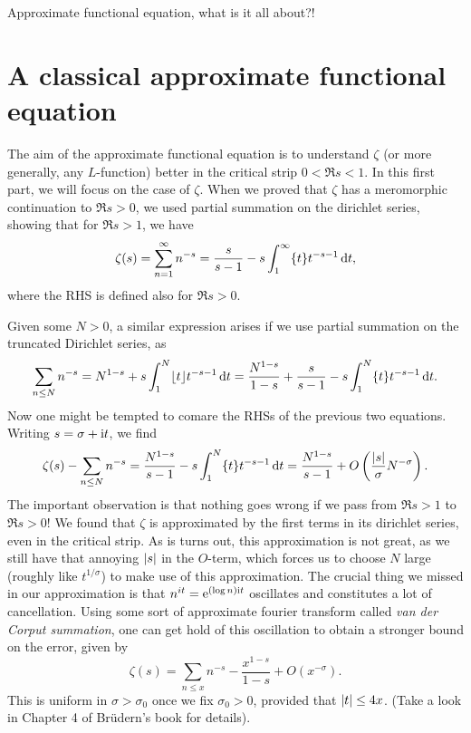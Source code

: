 \documentclass[a4paper,11pt]{article}
\author{Max von Consbruch}
\begin{document}
\begin{center}
    \huge{Approximate functional equation, what is it all about?!}
\end{center}

\section{A classical approximate functional equation} %
\label{sec:A classical approximate functional equation}

The aim of the approximate functional equation is to understand $\zeta$ (or more 
generally, any $L$-function) better in the critical strip $0 < \Re s < 1$. 
In this first part, we will focus on the case of $\zeta$. 
When we proved that $\zeta$ has a meromorphic continuation to $\Re s > 0$, we 
used partial summation on the dirichlet series, showing that for $\Re s > 1$, we have
\[
    \zeta(s) = \sum_{n=1}^\infty n^{-s} = \frac{s}{s-1} - s \int_1^\infty \{t\} t^{-s-1} \mathrm{\,d} t,
\]
where the RHS is defined also for $\Re s > 0$. 

Given some $N > 0$, a similar expression arises if we use partial
summation on the truncated Dirichlet series, as
\[
    \sum_{n \leq N} n^{-s} = N^{1-s} + s \int_1^N \lfloor t \rfloor t^{-s-1} \mathrm{\,d} t
    = \frac {N^{1-s}} {1-s} + \frac s{s-1} - s \int_1^N \{t\} t^{-s-1} \mathrm{\,d} t.
\]
Now one might be tempted to comare the RHSs of the previous two equations. Writing 
$s = \sigma + \mathrm i t$, we find
\[
    \zeta(s) - \sum_{n \leq N}n^{-s} = \frac{N^{1-s}}{s-1} - s \int_1^N \{t\}
    t^{-s-1} \mathrm{\,d} t = \frac {N^{1-s}}{s-1} + O\left(\frac{\left\lvert s \right\rvert}\sigma N^{-\sigma}
        \right).
\]
The important observation is that nothing goes wrong if we pass from $\Re s > 1$
to $\Re s > 0$! We found that $\zeta$ is approximated by the first terms 
in its dirichlet series, even in the critical strip. As is turns out, this 
approximation is not great, as we still have that annoying $\left\lvert s \right\rvert$ in the $O$-term,
which forces us to choose $N$ large (roughly like $t^{1/\sigma}$) to make use
of this approximation. The crucial thing we missed in our approximation is that
$n^{it} = \mathrm e^{(\log n) \mathrm i t}$ oscillates and constitutes a lot of
cancellation. Using some sort of approximate fourier transform called 
\textit{van der Corput summation}, one can get hold of this oscillation to
obtain a stronger bound on the error, given by
\[
    \zeta(s) = \sum_{n \leq x} n^{-s} - \frac{x^{1-s}}{1-s} + O(x^{-\sigma}).
\]
This is uniform in $\sigma > \sigma_0$ once we fix $\sigma_0 > 0$, provided that
$\left\lvert t \right\rvert \leq 4x$. (Take a look in Chapter 4 of Brüdern's book for details).
\end{document}

